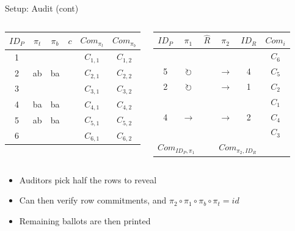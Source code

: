 \documentclass{beamer}
\begin{document}
\begin{frame}{Setup: Audit (cont)}
	\begingroup
	\fontsize{8pt}{10pt}\selectfont
	\begin{columns}
		\begin{center}
			\begin{tabular}{|c|c|c|c|c|c|}
				\hline
				$ID_P$ & $\pi_{t}$ & $\pi_{b}$ & $c$ & $Com_{\pi_{t}}$ & $Com_{\pi_{b}}$ \\
				\hline
				1 & & & & $C_{1, 1}$ & $C_{1, 2}$ \\
				2 & ab & ba & & $C_{2, 1}$ & $C_{2, 2}$ \\
				3 & & & & $C_{3, 1}$ & $C_{3, 2}$ \\
				4 & ba & ba & & $C_{4, 1}$ & $C_{4, 2}$ \\
				5 & ab & ba & & $C_{5, 1}$ & $C_{5, 2}$ \\
				6 & & & & $C_{6, 1}$ & $C_{6, 2}$ \\
				\hline
			\end{tabular}
		\end{center}

		\begin{center}
			\begin{tabular}{|c|c|c|c|c|c|}
				\hline
				$ID_P$ & $\pi_1$ & $\hat{R}$ & $\pi_2$ & $ID_R$ & $Com_{i}$ \\
				\hline
				  &                     & &                     &   & $C_6$ \\
				5 & $\circlearrowright$ & & $\rightarrow$       & 4 & $C_5$ \\
				2 & $\circlearrowright$ & & $\rightarrow$       & 1 & $C_2$ \\
				  &                     & &                     &   & $C_1$ \\
				4 & $\rightarrow$       & & $\rightarrow$       & 2 & $C_4$ \\
				  &                     & &                     &   & $C_3$ \\
				\hline
				\multicolumn{2}{|c|}{$Com_{ID_P, \pi_1}$} &   & \multicolumn{2}{c|}{$Com_{\pi_2, ID_R}$} & \\
				\hline
			\end{tabular}
		\end{center}
	\end{columns}
	\endgroup

	\begin{itemize}
		\item Auditors pick half the rows to reveal
		\item Can then verify row commitments, and $\pi_2 \circ \pi_1
			\circ \pi_b \circ \pi_t = id$
		\item Remaining ballots are then printed
	\end{itemize}
\end{frame}
\end{document}
